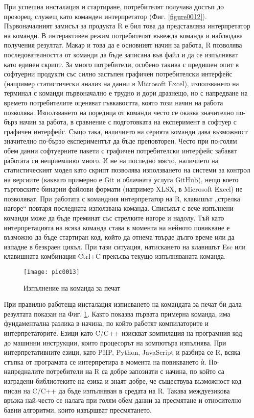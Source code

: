 При успешна инсталация и стартиране, потребителят получава достъп до прозорец, служещ като команден интерпретатор (Фиг. \ref{figure0012}). Първоначалният замисъл за продукта R е бил това да представлява интерпретатор на команди. В интерактивен режим потребителят въвежда команда и наблюдава получения резултат. Макар и това да е основният начин за работа, R позволява последователността от команди да бъде записана във файл и да се изпълняват като единен скрипт. За много потребители, особено такива с предишен опит в софтуерни продукти със силно застъпен графичен потребителски интерфейс (например статистически анализ на данни в Microsoft Excel), използването на терминал с команди първоначално е трудно и дори дразнещо, но с напредване на времето потребителите оценяват гъвкавостта, която този начин на работа позволява. Използването на поредица от команди често се оказва значително по-бърз начин за работа, в сравнение с подготовката на експеримент в софтуер с графичен интерфейс. Също така, наличието на серията команди дава възможност значително по-бързо експериментът да бъде преповторен. Често при по-голям обем данни софтуерните пакети с графичен потребителски интерфейс забавят работата си неприемливо много. И не на последно място, наличието на статистическият модел като скрипт позволява използването на системи за контрол на версиите (каквато примерно е Git и облачната услуга GitHub), нещо което търговските бинарни файлови формати (например XLSX, в Microsoft Excel) не позволяват. При работата с командния интерпретатор на R, клавишът „стрелка нагоре“ повтаря последната използвана команда. Списъкът с вече изпълнени команди може да бъде преминат със стрелките нагоре и надолу. Тъй като интерпретацията на всяка команда става в момента на нейното повикване е възможно да бъде стартиран код, който да отнема твърде дълго време или да изпадне в безкраен цикъл. При тази ситуация, натискането на клавишът Esc или клавишната комбинация Ctrl+C прекъсва текущо изпълняваната команда. 

\begin{figure}[h]
  \centering
  \texttt{[image: pic0013]}
  \caption{Изпълнение на команда за печат}
\label{figure0013}
\end{figure}
\FloatBarrier

При правилно работеща инсталация изписването на командата за печат би дала резултата показан на Фиг. \ref{figure0013}. Както показва първата примерна команда, има фундаментална разлика в начина, по който работят компилаторите и интерпретаторите. Езици като C/C++ изискват компилация на програмния код до машинни инструкции, които процесорът на компютъра изпълнява. При интерпретативните езици, като PHP, Python, JavaScript и разбира се R, всяка стъпка от програмата се интерпретира в момента на повикването ѝ. По-напредналите потребители на R са добре запознати с начина, по който са изградени библиотеките на езика и знаят добре, че съществува възможност код писан на C/C++ да бъде изпълняван в средата на R. Такава междуезикова връзка най-често се налага при голям обем данни за пресмятане и относително бавни алгоритми, които извършват пресмятането.

